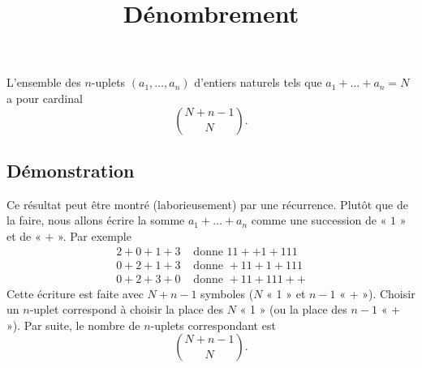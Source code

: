 \documentclass[fontsize=12pt,twoside=false,parskip=half]{scrartcl}
\title{Dénombrement}
\date{}
\author{}
\begin{document}
\maketitle
   \begin{Theoreme}
      L’ensemble des $n$-uplets $(a_1, \ldots, a_n)$ d’entiers naturels tels que $a_1 + \ldots + a_n = N$ a pour cardinal
      \[
         \binom{N + n - 1}{N}.
      \]
   \end{Theoreme}
   \subsection{Démonstration}
      Ce résultat peut être montré (laborieusement) par une récurrence. Plutôt que de la faire, nous allons écrire la
      somme $a_1 + \ldots + a_n$ comme une succession de « $1$ » et de « $+$ ». Par exemple
      \begin{align*}
         2 + 0 + 1 + 3 &\text{ donne } 11 + + 1 + 111\\ 
         0 + 2 + 1 + 3 &\text{ donne } + 11 + 1 + 111\\ 
         0 + 2 + 3 + 0 &\text{ donne } + 11 + 111 + +        
      \end{align*}
      Cette écriture est faite avec $N + n - 1$ symboles ($N$ « 1 » et $n - 1$ « + »). Choisir un $n$-uplet 
      correspond à choisir la place des $N$ « 1 » (ou la place des $n - 1$ « + »). Par suite, le nombre de 
      $n$-uplets correspondant est
      \[
         \binom{N + n - 1}{N}.
      \]
\end{document}

